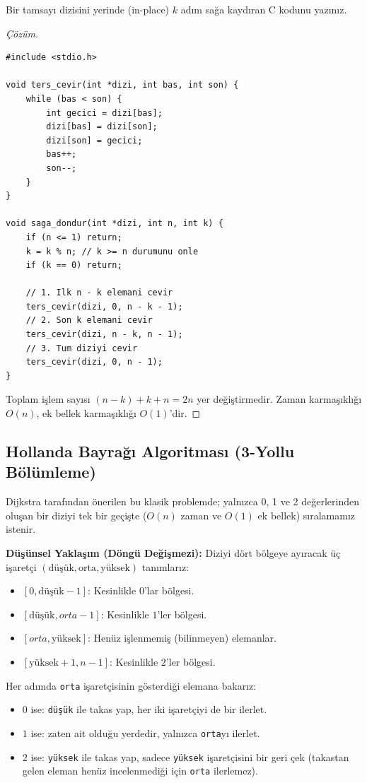 \begin{example}
Bir tamsayı dizisini yerinde (in-place) $k$ adım sağa kaydıran C kodunu yazınız.
\end{example}

\begin{proof}[Çözüm]
\begin{lstlisting}[language=CTemel]
#include <stdio.h>

void ters_cevir(int *dizi, int bas, int son) {
    while (bas < son) {
        int gecici = dizi[bas];
        dizi[bas] = dizi[son];
        dizi[son] = gecici;
        bas++;
        son--;
    }
}

void saga_dondur(int *dizi, int n, int k) {
    if (n <= 1) return;
    k = k % n; // k >= n durumunu onle
    if (k == 0) return;
    
    // 1. Ilk n - k elemani cevir
    ters_cevir(dizi, 0, n - k - 1);
    // 2. Son k elemani cevir
    ters_cevir(dizi, n - k, n - 1);
    // 3. Tum diziyi cevir
    ters_cevir(dizi, 0, n - 1);
}
\end{lstlisting}
Toplam işlem sayısı $(n-k) + k + n = 2n$ yer değiştirmedir. Zaman karmaşıklığı $O(n)$, ek bellek karmaşıklığı $O(1)$'dir.
\end{proof}

\subsection{Hollanda Bayrağı Algoritması (3-Yollu Bölümleme)}

Dijkstra tarafından önerilen bu klasik problemde; yalnızca 0, 1 ve 2 değerlerinden oluşan bir diziyi tek bir geçişte ($O(n)$ zaman ve $O(1)$ ek bellek) sıralamamız istenir.

\textbf{Düşünsel Yaklaşım (Döngü Değişmezi):}
Diziyi dört bölgeye ayıracak üç işaretçi $(\text{düşük}, \text{orta}, \text{yüksek})$ tanımlarız:
\begin{itemize}
    \item $[0, \text{düşük}-1]$: Kesinlikle $0$'lar bölgesi.
    \item $[\text{düşük}, orta-1]$: Kesinlikle $1$'ler bölgesi.
    \item $[orta, \text{yüksek}]$: Henüz işlenmemiş (bilinmeyen) elemanlar.
    \item $[\text{yüksek}+1, n-1]$: Kesinlikle $2$'ler bölgesi.
\end{itemize}

Her adımda \texttt{orta} işaretçisinin gösterdiği elemana bakarız:
\begin{itemize}
    \item $0$ ise: \texttt{düşük} ile takas yap, her iki işaretçiyi de bir ilerlet.
    \item $1$ ise: zaten ait olduğu yerdedir, yalnızca \texttt{orta}yı ilerlet.
    \item $2$ ise: \texttt{yüksek} ile takas yap, sadece \texttt{yüksek} işaretçisini bir geri çek (takastan gelen eleman henüz incelenmediği için \texttt{orta} ilerlemez).
\end{itemize}

